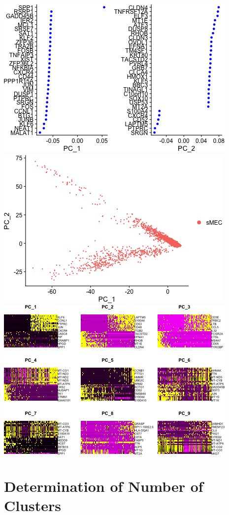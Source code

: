 \documentclass[]{article}
\begin{document}
\includegraphics{figures/dimensionality-pca-1.png}
\includegraphics{figures/dimensionality-pca-2.png}
\includegraphics{figures/dimensionality-pca-3.png}

\hypertarget{determination-of-number-of-clusters}{%
\section{Determination of Number of
Clusters}\label{determination-of-number-of-clusters}}
\end{document}
